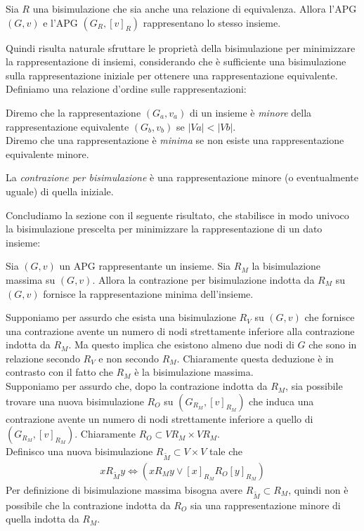 \begin{corollary}
    Sia $R$ una bisimulazione che sia anche una relazione di equivalenza. Allora l'APG $(G, v)$ e l'APG $(G_R, [v]_R)$ rappresentano lo stesso insieme.
\end{corollary}
Quindi risulta naturale sfruttare le proprietà della bisimulazione per minimizzare la rappresentazione di insiemi, considerando che è sufficiente una bisimulazione sulla rappresentazione iniziale per ottenere una rappresentazione equivalente. Definiamo una relazione d'ordine sulle rappresentazioni:
\begin{definition}
    Diremo che la rappresentazione $(G_a, v_a)$ di un insieme è \emph{minore} della rappresentazione equivalente $(G_b, v_b)$ se $|Va| < |Vb|$.\\
    Diremo che una rappresentazione è \emph{minima} se non esiste una rappresentazione equivalente minore.
\end{definition}
\begin{observation}
    La \emph{contrazione per bisimulazione} è una rappresentazione minore (o eventualmente uguale) di quella iniziale.
\end{observation}
Concludiamo la sezione con il seguente risultato, che stabilisce in modo univoco la bisimulazione prescelta per minimizzare la rappresentazione di un dato insieme:
\begin{theorem}
    Sia $(G,v)$ un APG rappresentante un insieme. Sia $R_M$ la bisimulazione massima su $(G,v)$. Allora la contrazione per bisimulazione indotta da $R_M$ su $(G,v)$ fornisce la rappresentazione minima dell'insieme.
\end{theorem}
\begin{proof2}
    Supponiamo per assurdo che esista una bisimulazione $R_V$ su $(G,v)$ che fornisce una contrazione avente un numero di nodi strettamente inferiore alla contrazione indotta da $R_M$. Ma questo implica che esistono almeno due nodi di $G$ che sono in relazione secondo $R_V$ e non secondo $R_M$. Chiaramente questa deduzione è in contrasto con il fatto che $R_M$ è la bisimulazione massima.\\
    Supponiamo per assurdo che, dopo la contrazione indotta da $R_M$, sia possibile trovare una nuova bisimulazione $R_O$ su $(G_{R_M}, [v]_{R_M})$ che induca una contrazione avente un numero di nodi strettamente inferiore a quello di $(G_{R_M}, [v]_{R_M})$. Chiaramente $R_O \subset V{R_M} \times V{R_M}$.\\
    Definisco una nuova bisimulazione $R_{\widetilde{M}} \subset V\times V$ tale che
    \begin{gather*}
        x R_{\widetilde{M}} y \iff (x R_M y \lor [x]_{R_M} R_O [y]_{R_M})
    \end{gather*}
    Per definizione di bisimulazione massima bisogna avere $R_{\widetilde{M}} \subset R_M$, quindi non è possibile che la contrazione indotta da $R_O$ sia una rappresentazione minore di quella indotta da $R_M$.
\end{proof2}

